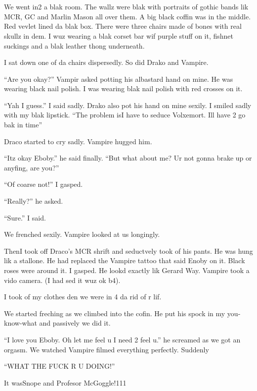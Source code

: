 \section{\chaptername~\thesection}



We went in2 a blak room. The wallz were blak with portraits of gothic bands lik MCR, GC and Marlin Mason all over them. A big black coffin was in the middle. Red vevlet lined da blak box. There were three chairs made of bones with real skullz in dem. I wuz wearing a blak corset bar wif purple stuff on it, fishnet suckings and a blak leather thong underneath.

I sat down one of da chairs dispersedly. So did Drako and Vampire.

\enquote{Are you okay?} Vampir asked potting his albastard hand on mine. He was wearing black nail polish. I was wearing blak nail polish with red crosses on it.

\enquote{Yah I guess.} I said sadly. Drako also pot his hand on mine sexily. I smiled sadly with my blak lipstick. \enquote{The problem is\dotfill\newline\phantom{}\dotfill I have to seduce Volxemort. Ill have 2 go bak in time}

Draco started to cry sadly. Vampire hugged him.

\enquote{Itz okay Eboby.} he said finally. \enquote{But what about me? Ur not gonna brake up or anyfing, are you?}

\enquote{Of coarse not!} I gasped.

\enquote{Really?} he asked.

\enquote{Sure.} I said.

We frenched sexily. Vampire looked at us longingly.

Then\dotfill I took off Draco's MCR shrift and seductvely\newline
took of his pants. He was hung lik a stallone. He had replaced the Vampire tattoo that said Enoby on it. Black roses were around it. I gasped. He lookd exactly lik Gerard Way. Vampire took a vido camera. (I had sed it wuz ok b4).

I took of my clothes den we were in 4 da rid of r lif.

We started freching as we climbed into the cofin. He put his spock in my you-know-what and passively we did it.

\enquote{I love you Eboby. Oh let me feel u I need 2 feel u.} he screamed as we got an orgasm. We watched Vampire filmed everything perfectly. Suddenly\dotfill

\enquote{WHAT THE FUCK R U DOING!}

It was\dotfill Snope and Profesor McGoggle!111
